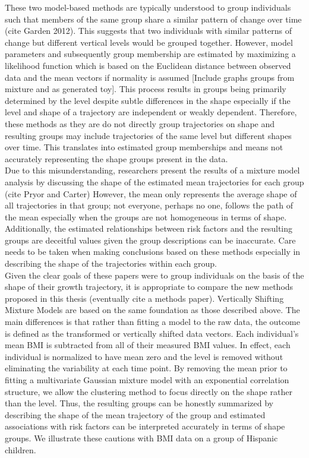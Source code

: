 \documentclass[11pt]{article}
\begin{document}
These two model-based methods are typically understood to group individuals such that members of the same group share a similar pattern of change over time (cite Garden 2012). This suggests that two individuals with similar patterns of change but different vertical levels would be grouped together. However, model parameters and subsequently group membership are estimated by maximizing a likelihood function which is based on the Euclidean distance between observed data and the mean vectors if normality is assumed [Include graphs groups from mixture and as generated toy]. This process results in groups being primarily determined by the level despite subtle differences in the shape especially if the level and shape of a trajectory are independent or weakly dependent. Therefore, these methods as they are do not directly group trajectories on shape and resulting groups may include trajectories of the same level but different shapes over time. This translates into estimated group memberships and means not accurately representing the shape groups present in the data.\\

Due to this misunderstanding, researchers present the results of a mixture model analysis by discussing the shape of the estimated mean trajectories for each group (cite Pryor and Carter) However, the mean only represents the average shape of all trajectories in that group; not everyone, perhaps no one, follows the path of the mean especially when the groups are not homogeneous in terms of shape. Additionally, the estimated relationships between risk factors and the resulting groups are deceitful values given the group descriptions can be inaccurate. Care needs to be taken when making conclusions based on these methods especially in describing the shape of the trajectories within each group.  \\

Given the clear goals of these papers were to group individuals on the basis of the shape of their growth trajectory, it is appropriate to compare the new methods proposed in this thesis (eventually cite a methods paper). Vertically Shifting Mixture Models are based on the same foundation as those described above. The main differences is that rather than fitting a model to the raw data, the outcome is defined as the transformed or vertically shifted data vectors. Each individual's mean BMI is subtracted from all of their measured BMI values. In effect, each individual is normalized to have mean zero and the level is removed without eliminating the variability at each time point. By removing the mean prior to fitting a multivariate Gaussian mixture model with an exponential correlation structure, we allow the clustering method to focus directly on the shape rather than the level. Thus, the resulting groups can be honestly summarized by describing the shape of the mean trajectory of the group and estimated associations with risk factors can be interpreted accurately in terms of shape groups. We illustrate these cautions with BMI data on a group of Hispanic children.
\end{document}
